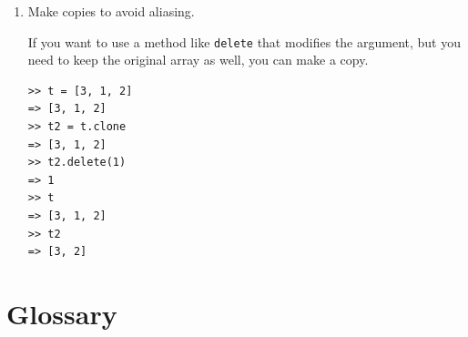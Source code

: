 \documentclass[10pt]{book}
\begin{document}
\begin{enumerate}
\item Make copies to avoid aliasing.

If you want to use a method like {\tt delete} that modifies
the argument, but you need to keep the original array as
well, you can make a copy.

\begin{verbatim}
>> t = [3, 1, 2]
=> [3, 1, 2]
>> t2 = t.clone
=> [3, 1, 2]
>> t2.delete(1)
=> 1
>> t
=> [3, 1, 2]
>> t2
=> [3, 2]
\end{verbatim}


\end{enumerate}



\section{Glossary}
\end{document}
